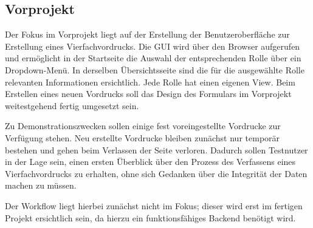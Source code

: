 \subsection{Vorprojekt}

    Der Fokus im Vorprojekt liegt auf der Erstellung der Benutzeroberfläche zur Erstellung eines Vierfachvordrucks. 
    Die GUI wird über den Browser aufgerufen und ermöglicht in der Startseite die Auswahl der entsprechenden Rolle über 
    ein Dropdown-Menü. In derselben Übersichtsseite sind die für die ausgewählte Rolle relevanten Informationen ersichtlich. 
    Jede Rolle hat einen eigenen View. Beim Erstellen eines neuen Vordrucks soll das Design des Formulars im Vorprojekt 
    weitestgehend fertig umgesetzt sein.
    
    Zu Demonstrationszwecken sollen einige fest voreingestellte Vordrucke zur Verfügung stehen. Neu erstellte Vordrucke
    bleiben zunächst nur temporär bestehen und gehen beim Verlassen der Seite verloren. Dadurch sollen Testnutzer
    in der Lage sein, einen ersten Überblick über den Prozess des Verfassens eines Vierfachvordrucks zu erhalten,
    ohne sich Gedanken über die Integrität der Daten machen zu müssen.

    Der Workflow liegt hierbei zunächst nicht im Fokus; dieser wird erst im fertigen Projekt ersichtlich sein, da hierzu
    ein funktionsfähiges Backend benötigt wird.
